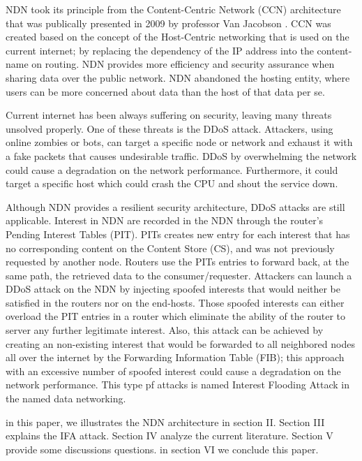 \documentclass[twocolumn]{article}
\begin{document}
NDN took its principle from the Content-Centric Network (CCN) architecture that was publically presented in 2009 by professor Van Jacobson \cite{Jacobson:2009:NNC:1658939.1658941}. CCN was created based on the concept of the Host-Centric networking that is used on the current internet; by replacing the dependency of the IP address into the content-name on routing. NDN provides more efficiency and security assurance when sharing data over the public network. NDN abandoned the hosting entity, where users can be more concerned about data than the host of that data per se. 

Current internet has been always suffering on security, leaving many threats unsolved properly. One of these threats is the DDoS attack. Attackers, using online zombies or bots, can target a specific node or network and exhaust it with a fake packets that causes undesirable traffic. DDoS by overwhelming the network could cause a degradation on the network performance. Furthermore, it could target a specific host which could crash the CPU and shout the service down.

Although NDN provides a resilient security architecture, DDoS attacks are still applicable. Interest in NDN are recorded in the NDN through the router's Pending Interest Tables (PIT). PITs creates new entry for each interest that has no corresponding content on the Content Store (CS), and was not previously requested by another node. Routers use the PITs entries to forward back, at the same path, the retrieved data to the consumer/requester. Attackers can launch a DDoS attack on the NDN by injecting spoofed interests that would neither be satisfied in the routers nor on the end-hosts. Those spoofed interests can either overload the PIT entries in a router which eliminate the ability of the router to server any further legitimate interest. Also, this attack can be achieved by creating an non-existing interest that would be forwarded to all neighbored nodes all over the internet by the Forwarding Information Table (FIB); this approach with an excessive number of spoofed interest could cause a degradation on the network performance. This type pf attacks is named Interest Flooding Attack in the named data networking. 

in this paper, we illustrates the NDN architecture in section II. Section III explains the IFA attack. Section IV analyze the current literature. Section V provide some discussions questions. in section VI we conclude this paper.   
\end{document}

